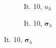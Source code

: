 \documentclass[a4paper,12pt]{amsart}
\numberwithin{equation}{section}
\def\bsigma{{\boldsymbol \sigma}}
\begin{document}
\begin{figure}[h!]
\begin{subfigure}[t]{0.35\textwidth}
	\caption{It. 10, $u_h$}
\end{subfigure}
	\hfill
\begin{subfigure}[t]{0.35\textwidth}
	\caption{It. 10, $\bsigma_h$}
\end{subfigure}


\end{figure}
\end{document}
